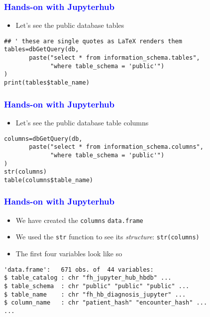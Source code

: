 \documentclass[11pt,pdftex,dvipsnames,usenames]{beamer}
\begin{document}
\begin{frame}[fragile]\frametitle{\bf\textcolor{blue}{Hands-on with Jupyterhub}}
\begin{itemize}
\item Let's see the public database tables
\end{itemize}
\begin{verbatim}
## ' these are single quotes as LaTeX renders them
tables=dbGetQuery(db, 
       paste("select * from information_schema.tables",
             "where table_schema = 'public'")
)
print(tables$table_name)
\end{verbatim}
\end{frame}

\begin{frame}[fragile]\frametitle{\bf\textcolor{blue}{Hands-on with Jupyterhub}}
\begin{itemize}
\item Let's see the public database table columns
\end{itemize}
\begin{verbatim}
columns=dbGetQuery(db, 
       paste("select * from information_schema.columns",
             "where table_schema = 'public'")
)
str(columns)
table(columns$table_name)
\end{verbatim}
\end{frame}

\begin{frame}[fragile]\frametitle{\bf\textcolor{blue}{Hands-on with Jupyterhub}}
\begin{itemize}
\item We have created the \texttt{columns} \texttt{data.frame}
\item We used the \texttt{str} function to see its {\it structure}: \texttt{str(columns)}
\item The first four variables look like so
\end{itemize}
\begin{verbatim}
'data.frame':	671 obs. of  44 variables:
$ table_catalog : chr "fh_jupyter_hub_hbdb" ...
$ table_schema  : chr "public" "public" "public" ...
$ table_name    : chr "fh_hb_diagnosis_jupyter" ...
$ column_name   : chr "patient_hash" "encounter_hash" ...
...
\end{verbatim}
\end{frame}
\end{document}
